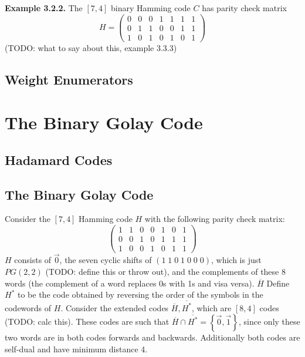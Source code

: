 \documentclass{article}
\newcommand{\extended}[1]{\overline{#1}}
\renewcommand{\=}{\equiv}
\newcommand{\set}[1]{\left\{ #1 \right\}}
\renewcommand{\v}{\vec}
\newcommand{\example}[1]{\vspace{1em}\noindent\textbf{Example #1.} }
\newcommand{\TODO}[1]{(TODO: #1)}
\begin{document}
\example{3.2.2}
The $[7,4]$ binary Hamming code $C$ has parity check matrix
$$ H = \begin{pmatrix}
  0 & 0 & 0 & 1 & 1 & 1 & 1 \\
  0 & 1 & 1 & 0 & 0 & 1 & 1 \\
  1 & 0 & 1 & 0 & 1 & 0 & 1
\end{pmatrix} $$
\TODO{what to say about this, example 3.3.3}


\subsection{Weight Enumerators}

\section{The Binary Golay Code}

\subsection{Hadamard Codes}

\subsection{The Binary Golay Code}

Consider the $[7,4]$ Hamming code $H$ with the following parity check matrix:
$$ \begin{pmatrix}
  1 & 1 & 0 & 0 & 1 & 0 & 1 \\
  0 & 0 & 1 & 0 & 1 & 1 & 1 \\
  1 & 0 & 0 & 1 & 0 & 1 & 1
\end{pmatrix} $$
$H$ consists of $\v 0$, the seven cyclic shifts of $(1\;1\;0\;1\;0\;0\;0)$, which is just $PG(2,2)$ \TODO{define this or throw out}, and the complements of these 8 words (the complement of a word replaces 0s with 1s and visa versa).
$\extended{H}$
Define $H^*$ to be the code obtained by reversing the order of the symbols in the codewords of $H$.
Consider the extended codes $\extended{H}, \extended{H^*}$, which are $[8,4]$ codes \TODO{calc this}.
These codes are such that $\extended{H} \cap \extended{H^*} = \set{ \v 0, \v 1 }$, since only these two words are in both codes forwards and backwards. Additionally both codes are self-dual and have minimum distance 4.
\end{document}
